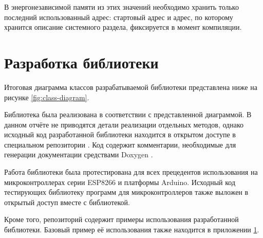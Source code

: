 В энергонезависимой памяти из этих значений необходимо хранить только последний использованный адрес: стартовый адрес и адрес, по которому хранится описание системного раздела, фиксируется в момент компиляции.

\section{Разработка библиотеки}

Итоговая диаграмма классов разрабатываемой библиотеки представлена ниже на рисунке \ref{fig:class-diagram}.



Библиотека была реализована в соответствии с представленной диаграммой.
В данном отчёте не приводятся детали реализации отдельных методов, однако исходный код разработанной библиотеки находится в открытом доступе в специальном репозитории \cite{web:my-eemanager}.
Код содержит комментарии, необходимые для генерации документации средствами Doxygen \cite{web:doxygen}.

Работа библиотеки была протестирована для всех прецедентов использования на микроконтроллерах серии ESP8266 и платформы Arduino.
Исходный код тестирующих библиотеку программ для микроконтроллеров также выложен в открытый доступ вместе с библиотекой.

Кроме того, репозиторий содержит примеры использования разработанной библиотеки.
Базовый пример её использования также находится в приложении \ref{}.
